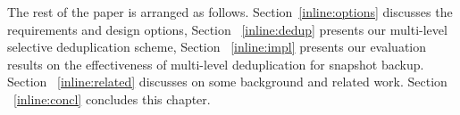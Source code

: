 

The rest of the paper is arranged as follows. 
Section~\ref{inline:options} discusses the requirements and  design options,
Section ~\ref{inline:dedup} presents our multi-level selective deduplication scheme,
Section ~\ref{inline:impl} presents our evaluation results on the effectiveness
of multi-level deduplication for snapshot backup. 
Section ~\ref{inline:related}
discusses on some background and related work.
Section ~\ref{inline:concl} concludes this chapter.


